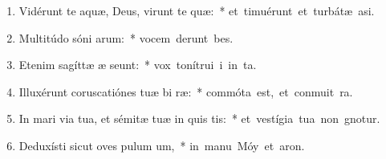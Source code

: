 \begin{flushleft}
\begin{enumerate}[leftmargin=*]
\item Vidérunt te aquæ, Deus, virunt te quæ:~* \mbox{et timuérunt et turbátæ  asi.}
\item Multitúdo sóni arum:~* \mbox{vocem derunt bes.}
\item Etenim sagíttæ æ seunt:~* \mbox{vox tonítrui i in ta.}
\item Illuxérunt coruscatiónes tuæ bi ræ:~* \mbox{commóta est, et conmuit ra.}
\item In mari via tua, et sémitæ tuæ in quis tis:~* \mbox{et vestígia tua non gnotur.}
\item Deduxísti sicut oves pulum um,~* \mbox{in manu Móy et aron.}

\end{enumerate}
\end{flushleft}

